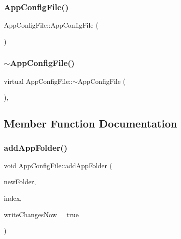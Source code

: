 \subsubsection{\texorpdfstring{App\+Config\+File()}{AppConfigFile()}}
{\footnotesize\ttfamily App\+Config\+File\+::\+App\+Config\+File (\begin{DoxyParamCaption}{ }\end{DoxyParamCaption})}

\mbox{\label{classAppConfigFile_a8748d74c5d81884dcf9de17f7f3655b4}} 
\subsubsection{\texorpdfstring{$\sim$\+App\+Config\+File()}{~AppConfigFile()}}
{\footnotesize\ttfamily virtual App\+Config\+File\+::$\sim$\+App\+Config\+File (\begin{DoxyParamCaption}{ }\end{DoxyParamCaption})\hspace{0.3cm}{\ttfamily [inline]}, {\ttfamily [virtual]}}



\subsection{Member Function Documentation}
\mbox{\label{classAppConfigFile_a0d5b0b0ccc5956f17fdb78a62b46d966}} 
\subsubsection{\texorpdfstring{add\+App\+Folder()}{addAppFolder()}}
{\footnotesize\ttfamily void App\+Config\+File\+::add\+App\+Folder (\begin{DoxyParamCaption}\item[{\mbox{\hyperlink{structAppConfigFile_1_1AppFolder}{App\+Config\+File\+::\+App\+Folder}}}]{new\+Folder,  }\item[{int}]{index,  }\item[{bool}]{write\+Changes\+Now = {\ttfamily true} }\end{DoxyParamCaption})}

